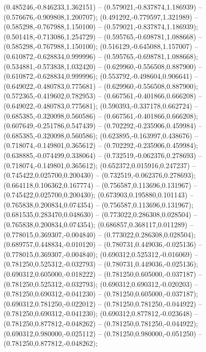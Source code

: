  (0.485246,-0.846233,1.362151) -- (0.579021,-0.837874,1.186939) -- (0.576676,-0.909808,1.200707);
 (0.491292,-0.779597,1.321989) -- (0.585298,-0.767988,1.150100) -- (0.579021,-0.837874,1.186939);
 (0.501418,-0.713086,1.254729) -- (0.595765,-0.698781,1.088668) -- (0.585298,-0.767988,1.150100);
 (0.516129,-0.645088,1.157007) -- (0.610872,-0.628834,0.999996) -- (0.595765,-0.698781,1.088668);
 (0.534881,-0.573838,1.032420) -- (0.629960,-0.556508,0.887900) -- (0.610872,-0.628834,0.999996);
 (0.553792,-0.498604,0.906641) -- (0.649022,-0.480783,0.775681) -- (0.629960,-0.556508,0.887900);
 (0.572365,-0.419602,0.782953) -- (0.667561,-0.401866,0.666208) -- (0.649022,-0.480783,0.775681);
 (0.590393,-0.337178,0.662724) -- (0.685385,-0.320098,0.560586) -- (0.667561,-0.401866,0.666208);
 (0.607649,-0.251786,0.547439) -- (0.702292,-0.235906,0.459984) -- (0.685385,-0.320098,0.560586);
 (0.623895,-0.163997,0.438676) -- (0.718074,-0.149801,0.365612) -- (0.702292,-0.235906,0.459984);
 (0.638885,-0.074499,0.338064) -- (0.732519,-0.062376,0.278693) -- (0.718074,-0.149801,0.365612);
 (0.652372,0.015916,0.247237) -- (0.745422,0.025700,0.200430) -- (0.732519,-0.062376,0.278693);
 (0.664118,0.106362,0.167774) -- (0.756587,0.113696,0.131967) -- (0.745422,0.025700,0.200430);
 (0.673903,0.195880,0.101143) -- (0.765838,0.200834,0.074354) -- (0.756587,0.113696,0.131967);
 (0.681535,0.283470,0.048630) -- (0.773022,0.286308,0.028504) -- (0.765838,0.200834,0.074354);
 (0.686857,0.368117,0.011289) -- (0.778015,0.369307,-0.004840) -- (0.773022,0.286308,0.028504);
 (0.689757,0.448834,-0.010120) -- (0.780731,0.449036,-0.025136) -- (0.778015,0.369307,-0.004840);
 (0.690312,0.525312,-0.016069) -- (0.781250,0.525312,-0.032793) -- (0.780731,0.449036,-0.025136);
 (0.690312,0.605000,-0.018222) -- (0.781250,0.605000,-0.037187) -- (0.781250,0.525312,-0.032793);
 (0.690312,0.690312,-0.020203) -- (0.781250,0.690312,-0.041230) -- (0.781250,0.605000,-0.037187);
 (0.690312,0.781250,-0.022012) -- (0.781250,0.781250,-0.044922) -- (0.781250,0.690312,-0.041230);
 (0.690312,0.877812,-0.023648) -- (0.781250,0.877812,-0.048262) -- (0.781250,0.781250,-0.044922);
 (0.690312,0.980000,-0.025112) -- (0.781250,0.980000,-0.051250) -- (0.781250,0.877812,-0.048262);
